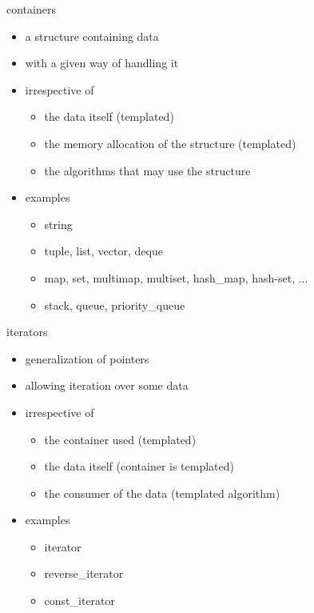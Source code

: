 \begin{frame}[fragile]
  \begin{block}{containers}
    \begin{itemize}
    \item a structure containing data
    \item with a given way of handling it
    \item irrespective of
      \begin{itemize}
      \item the data itself (templated)
      \item the memory allocation of the structure (templated)
      \item the algorithms that may use the structure
      \end{itemize}
    \item examples
      \begin{itemize}
      \item string
      \item tuple, list, vector, deque
      \item map, set, multimap, multiset, hash\_map, hash-set, ...
      \item stack, queue, priority\_queue
      \end{itemize}
    \end{itemize}
  \end{block}
\end{frame}

\begin{frame}[fragile]
  \begin{block}{iterators}
    \begin{itemize}
    \item generalization of pointers
    \item allowing iteration over some data
    \item irrespective of
      \begin{itemize}
      \item the container used (templated)
      \item the data itself (container is templated)
      \item the consumer of the data (templated algorithm)
      \end{itemize}
    \item examples
      \begin{itemize}
      \item iterator
      \item reverse\_iterator
      \item const\_iterator
      \end{itemize}
    \end{itemize}
  \end{block}
\end{frame}

